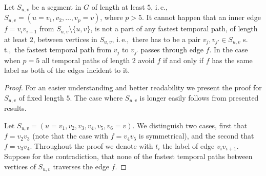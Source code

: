 \documentclass[a4paper,UKenglish,cleveref, autoref, thm-restate]{lipics-v2021}
\newcommand{\ie}{i.\,e.,\ }
\renewcommand{\st}{s.\,t.,\ }
\begin{document}
\begin{lemma}\label{lemma:FPT-noUndeterminedEdgeInSegment}
Let $S_{u,v}$ be a segment in $G$ of length at least $5$,
\ie $S_{u,v}= (u=v_1,v_2, \dots, v_p = v)$, where $p > 5$.
It cannot happen that an inner edge $f = v_i v_{i+1}$ from $S_{u,v} \setminus \{u,v\}$,
is not a part of any fastest temporal path, of length at least $2$, between vertices in $S_{u,v}$,
\ie there has to be a pair $v_j, v_{j'} \in S_{u,v}$ \st the fastest temporal path from $v_j$ to $v_{j'}$ passes through edge $f$.
In the case when $p = 5$ all temporal paths of length $2$ avoid $f$ if and only if $f$ has the same label as both of the edges incident to it.
\end{lemma}

\begin{proof}
    For an easier understanding and better readability we present the proof for $S_{u,v}$ of fixed length $5$.
    The case where $S_{u,v}$ is longer easily follows from presented results.

    Let $S_{u,v} = (u=v_1,v_2, v_3, v_4, v_5, v_6=v)$.
    We distinguish two cases, first that $f = v_2v_3$ (note that the case with $f = v_4v_5$ is symmetrical),
    and the second that  $f = v_3v_4$.
    Throughout the proof we denote with $t_i$ the label of edge $v_i v_{i+1}$.
    Suppose for the contradiction, that none of the fastest temporal paths between vertices of $S_{u,v}$ traverses the edge $f$.


\end{proof}
\end{document}
